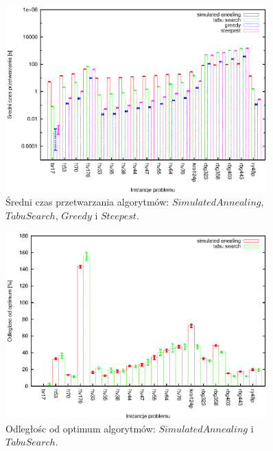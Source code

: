 \begin{figure}
\begin{center}
\includegraphics[width=0.9\textwidth]{wykresy/anealing_tabu_greedy_time_log}
\end{center}
\caption{Średni czas przetwarzania algorytmów: 
$Simulated Annealing$, $Tabu Search$, $Greedy$ i $Steepest$.}
\label{anealing_tabu_greedy_time_log}
\end{figure}

\begin{figure}
\begin{center}
\includegraphics[width=0.9\textwidth]{wykresy/anealing_tabu_quality}
\end{center}
\caption{Odległośc od optimum algorytmów: $Simulated Annealing$ i 
$Tabu Search$.}
\label{anealing_tabu_quality}
\end{figure}

